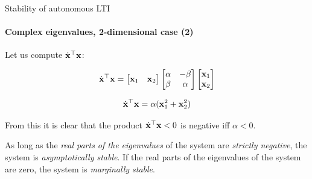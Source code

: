 \documentclass{beamer}
\begin{document}
\begin{frame}{Stability of autonomous LTI}
\framesubtitle{Complex eigenvalues, 2-dimensional case (2)}
\begin{flushleft}

Let us compute $\dot{\mathbf{x}}^\top \mathbf{x}$:

\begin{equation}
\dot{\mathbf{x}}^\top \mathbf{x} =
\begin{bmatrix}
    \mathbf{x}_1 & \mathbf{x}_2
\end{bmatrix}
\begin{bmatrix}
    \alpha & -\beta \\ \beta & \alpha
\end{bmatrix}     
\begin{bmatrix}
    \mathbf{x}_1 \\ \mathbf{x}_2
\end{bmatrix}
\end{equation}

\begin{equation}
\dot{\mathbf{x}}^\top \mathbf{x} =
\alpha (\mathbf{x}_1^2 + \mathbf{x}_2^2)
\end{equation}

From this it is clear that the product $\dot{\mathbf{x}}^\top \mathbf{x} < 0$ is negative iff $\alpha < 0$.

\begin{definition}
As long as the \emph{real parts of the eigenvalues} of the system are \emph{strictly negative}, the system is \emph{asymptotically stable}. If the real parts of the eigenvalues of the system are zero, the system is \emph{marginally stable}.
\end{definition}

\end{flushleft}
\end{frame}
\end{document}
